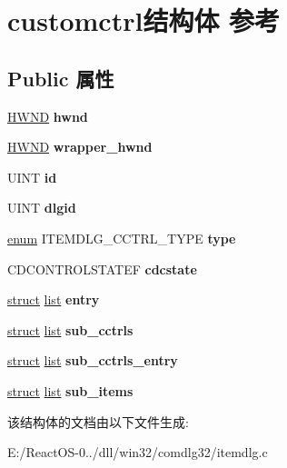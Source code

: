 \hypertarget{structcustomctrl}{}\section{customctrl结构体 参考}
\label{structcustomctrl}
\subsection*{Public 属性}
\begin{DoxyCompactItemize}
\item 
\mbox{\label{structcustomctrl_a78afb4b454eb857e2faad59dc09bd6dd}} 
\hyperlink{interfacevoid}{H\+W\+ND} {\bfseries hwnd}
\item 
\mbox{\label{structcustomctrl_a4c11e3fdceb5bb8addc11690d0120825}} 
\hyperlink{interfacevoid}{H\+W\+ND} {\bfseries wrapper\+\_\+hwnd}
\item 
\mbox{\label{structcustomctrl_a5b066cf7c093fde8ba5ad79d846123e2}} 
U\+I\+NT {\bfseries id}
\item 
\mbox{\label{structcustomctrl_af61b6e1361f6dbb6d54af8a89beb8208}} 
U\+I\+NT {\bfseries dlgid}
\item 
\mbox{\label{structcustomctrl_a65584240cf6a83af9f3c88d567710914}} 
\hyperlink{interfaceenum}{enum} I\+T\+E\+M\+D\+L\+G\+\_\+\+C\+C\+T\+R\+L\+\_\+\+T\+Y\+PE {\bfseries type}
\item 
\mbox{\label{structcustomctrl_a8c9b48c508cdceb4316a87a07045564d}} 
C\+D\+C\+O\+N\+T\+R\+O\+L\+S\+T\+A\+T\+EF {\bfseries cdcstate}
\item 
\mbox{\label{structcustomctrl_ae24797e570f8655050c99eafa52b16ce}} 
\hyperlink{interfacestruct}{struct} \hyperlink{classlist}{list} {\bfseries entry}
\item 
\mbox{\label{structcustomctrl_aeca236cb678e22e824abe8ef0b395004}} 
\hyperlink{interfacestruct}{struct} \hyperlink{classlist}{list} {\bfseries sub\+\_\+cctrls}
\item 
\mbox{\label{structcustomctrl_a8eaf90bc29c3105ff8ead474f425df7e}} 
\hyperlink{interfacestruct}{struct} \hyperlink{classlist}{list} {\bfseries sub\+\_\+cctrls\+\_\+entry}
\item 
\mbox{\label{structcustomctrl_ae9643525df917161c41ea2e85253e27c}} 
\hyperlink{interfacestruct}{struct} \hyperlink{classlist}{list} {\bfseries sub\+\_\+items}
\end{DoxyCompactItemize}


该结构体的文档由以下文件生成\+:\begin{DoxyCompactItemize}
\item 
E\+:/\+React\+O\+S-\/0../dll/win32/comdlg32/itemdlg.\+c\end{DoxyCompactItemize}
